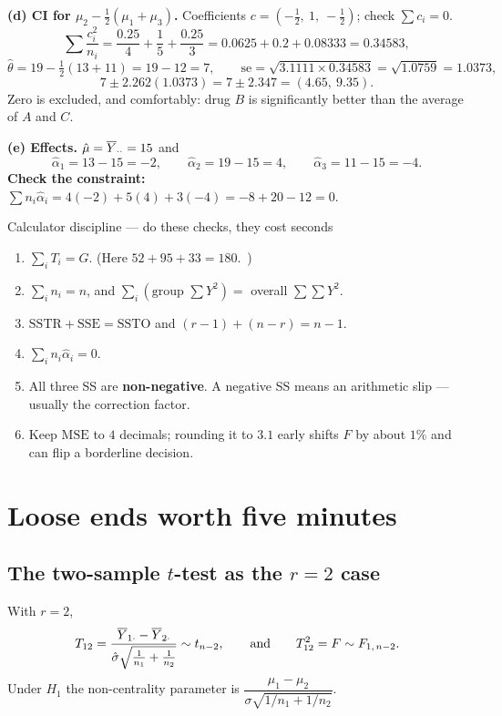 \documentclass[11pt]{article}
\begin{document}
\medskip
\textbf{(d) CI for $\mu_2-\tfrac12(\mu_1+\mu_3)$.} Coefficients
$c=(-\tfrac12,\ 1,\ -\tfrac12)$; check $\sum c_i=0$. \checkmark
\[
  \sum\frac{c_i^2}{n_i}=\frac{0.25}{4}+\frac{1}{5}+\frac{0.25}{3}
  =0.0625+0.2+0.08333=0.34583 ,
\]
\[
  \hat\theta=19-\tfrac12(13+11)=19-12=7,\qquad
  \mathrm{se}=\sqrt{3.1111\times0.34583}=\sqrt{1.0759}=1.0373,
\]
\[
  7\pm2.262(1.0373)=7\pm2.347=\boxed{(4.65,\ 9.35)} .
\]
Zero is excluded, and comfortably: drug $B$ is significantly better than the average of $A$
and $C$.

\medskip
\textbf{(e) Effects.} $\hat\mu=\overline{Y}_{\cdot\cdot}=15$ and
\[
  \hat\alpha_1=13-15=-2,\qquad \hat\alpha_2=19-15=4,\qquad \hat\alpha_3=11-15=-4 .
\]
\textbf{Check the constraint:} $\sum n_i\hat\alpha_i=4(-2)+5(4)+3(-4)=-8+20-12=0$. \checkmark

\begin{recipe}{Calculator discipline --- do these checks, they cost seconds}
\begin{enumerate}
  \item $\sum_i T_i = G$. \quad (Here $52+95+33=180$.\ \checkmark)
  \item $\sum_i n_i = n$, and $\sum_i (\text{group } \sum Y^2) = $ overall $\sum\sum Y^2$.
  \item $\mathrm{SSTR}+\mathrm{SSE}=\mathrm{SSTO}$ and $(r-1)+(n-r)=n-1$.
  \item $\sum_i n_i\hat\alpha_i=0$.
  \item All three SS are \textbf{non-negative}. A negative SS means an arithmetic slip ---
        usually the correction factor.
  \item Keep $\mathrm{MSE}$ to $4$ decimals; rounding it to $3.1$ early shifts $F$ by about
        $1\%$ and can flip a borderline decision.
\end{enumerate}
\end{recipe}

\section{Loose ends worth five minutes}

\subsection{The two-sample $t$-test as the $r=2$ case}
With $r=2$,
\[
  T_{12}=\frac{\overline{Y}_{1\cdot}-\overline{Y}_{2\cdot}}{\hat\sigma\sqrt{\tfrac1{n_1}+\tfrac1{n_2}}}\sim t_{n-2},
  \qquad\text{and}\qquad T_{12}^2 = F \sim F_{1,\,n-2}.
\]
Under $H_1$ the non-centrality parameter is
$\dfrac{\mu_1-\mu_2}{\sigma\sqrt{1/n_1+1/n_2}}$.
\end{document}
